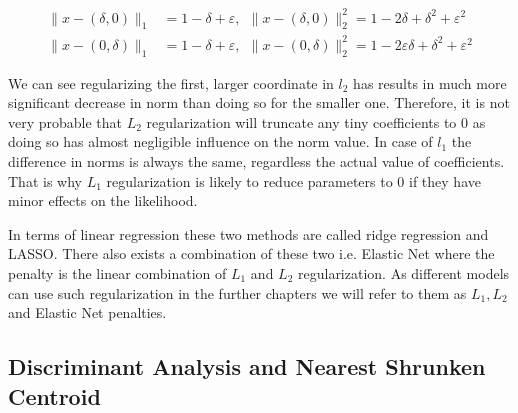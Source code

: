 \documentclass[shortabstract, english, mgr]{iithesis}
\begin{document}
\begin{align*}
    \|x-(\delta, 0)\|_{1}&=1-\delta+\varepsilon, \ \   \|x-(\delta, 0)\|_{2}^{2}=1-2 \delta+\delta^{2}+\varepsilon^{2} \\ 
    \|x-(0, \delta)\|_{1}&=1-\delta+\varepsilon, \ \  \|x-(0, \delta)\|_{2}^{2}=1-2 \varepsilon \delta+\delta^{2}+\varepsilon^{2}
\end{align*}

We can see regularizing the first, larger coordinate in $l_2$ has results in much more significant decrease in norm than doing so for the smaller one. Therefore, it is not very probable that $L_2$ regularization will truncate any tiny coefficients to $0$ as doing so has almost negligible influence on the norm value. In case of $l_1$ the difference in norms is always the same, regardless the actual value of coefficients. That is why $L_1$ regularization is likely to reduce parameters to $0$ if they have minor effects on the likelihood. 

In terms of linear regression these two methods are called ridge regression and LASSO. There also exists a combination of these two i.e. Elastic Net where the penalty is the linear combination of $L_1$ and $L_2$ regularization. As different models can use such regularization in the further chapters we will refer to them as $L_1, L_2$ and Elastic Net penalties.

\subsection{Discriminant Analysis and Nearest Shrunken Centroid}
\end{document}
